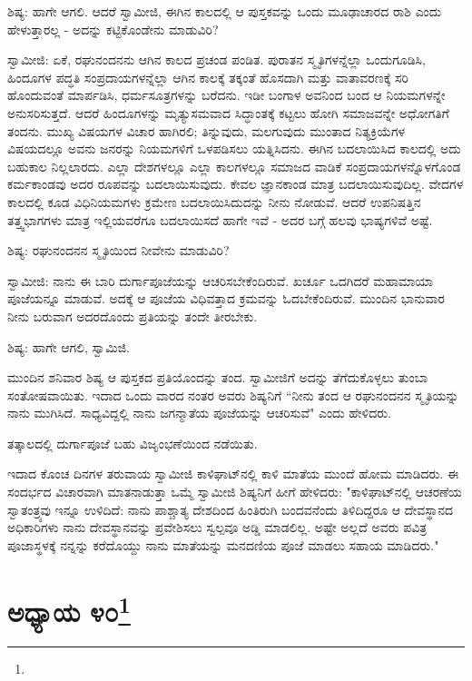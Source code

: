 ಶಿಷ್ಯ: ಹಾಗೇ ಆಗಲಿ. ಆದರೆ ಸ್ವಾಮೀಜಿ, ಈಗಿನ ಕಾಲದಲ್ಲಿ ಆ ಪುಸ್ತಕವನ್ನು ಒಂದು ಮೂಢಾಚಾರದ ರಾಶಿ ಎಂದು ಹೇಳುತ್ತಾರಲ್ಲ - ಅದನ್ನು ಕಟ್ಟಿಕೊಂಡೇನು ಮಾಡುವಿರಿ?

ಸ್ವಾಮೀಜಿ: ಏಕೆ, ರಘುನಂದನನು ಆಗಿನ ಕಾಲದ ಪ್ರಚಂಡ ಪಂಡಿತ. ಪುರಾತನ ಸ್ಮೃತಿಗಳನ್ನೆಲ್ಲಾ ಒಂದುಗೂಡಿಸಿ, ಹಿಂದೂಗಳ ಪದ್ಧತಿ ಸಂಪ್ರದಾಯಗಳನ್ನೆಲ್ಲಾ ಆಗಿನ ಕಾಲಕ್ಕೆ ತಕ್ಕಂತೆ ಹೊಸದಾಗಿ ಮತ್ತು ವಾತಾವರಣಕ್ಕೆ ಸರಿ ಹೊಂದುವಂತೆ ಮಾರ್ಪಡಿಸಿ, ಧರ್ಮಸೂತ್ರಗಳನ್ನು ಬರೆದನು. ಇಡೀ ಬಂಗಾಳ ಅವನಿಂದ ಬಂದ ಆ ನಿಯಮಗಳನ್ನೇ ಅನುಸರಿಸುತ್ತದೆ. ಆದರೆ ಹಿಂದೂಗಳನ್ನು ಮೃತ್ಯುಸಮವಾದ ಸಿದ್ಧಾಂತಕ್ಕೆ ಕಟ್ಟಲು ಹೋಗಿ ಸಮಾಜವನ್ನೇ ಅಧೋಗತಿಗೆ ತಂದನು. ಮುಖ್ಯ ವಿಷಯಗಳ ವಿಚಾರ ಹಾಗಿರಲಿ; ತಿನ್ನುವುದು, ಮಲಗುವುದು ಮುಂತಾದ ನಿತ್ಯಕ್ರಿಯೆಗಳ ವಿಷಯದಲ್ಲೂ ಅವನು ಜನರನ್ನು ನಿಯಮಗಳಿಗೆ ಒಳಪಡಿಸಲು ಯತ್ನಿಸಿದನು. ಈಗಿನ ಬದಲಾಯಿಸಿದ ಕಾಲದಲ್ಲಿ ಅದು ಬಹುಕಾಲ ನಿಲ್ಲಲಾರದು. ಎಲ್ಲಾ ದೇಶಗಳಲ್ಲೂ ಎಲ್ಲಾ ಕಾಲಗಳಲ್ಲೂ ಸಮಾಜದ ವಾಡಿಕೆ ಸಂಪ್ರದಾಯಗಳನ್ನೊಳಗೊಂಡ ಕರ್ಮಕಾಂಡವು ಅದರ ರೂಪವನ್ನು ಬದಲಾಯಿಸುವುದು. ಕೇವಲ ಜ್ಞಾನಕಾಂಡ ಮಾತ್ರ ಬದಲಾಯಿಸುವುದಿಲ್ಲ. ವೇದಗಳ ಕಾಲದಲ್ಲಿ ಕೂಡ ವಿಧಿನಿಯಮಗಳು ಕ್ರಮೇಣ ಬದಲಾಯಿಸಿದುದನ್ನು ನೀನು ನೋಡುವೆ. ಆದರೆ ಉಪನಿಷತ್ತಿನ ತತ್ತ್ವಭಾಗಗಳು ಮಾತ್ರ ಇಲ್ಲಿಯವರೆಗೂ ಬದಲಾಯಿಸದೆ ಹಾಗೇ ಇವೆ - ಅದರ ಬಗ್ಗೆ ಹಲವು ಭಾಷ್ಯಗಳಿವೆ ಅಷ್ಟೆ.

ಶಿಷ್ಯ: ರಘುನಂದನನ ಸ್ಮೃತಿಯಿಂದ ನೀವೇನು ಮಾಡುವಿರಿ?

ಸ್ವಾಮೀಜಿ: ನಾನು ಈ ಬಾರಿ ದುರ್ಗಾಪೂಜೆಯನ್ನು ಆಚರಿಸಬೇಕೆಂದಿರುವೆ. ಖರ್ಚೂ ಒದಗಿದರೆ ಮಹಾಮಾಯಾ ಪೂಜೆಯನ್ನೂ ಮಾಡುವೆ. ಅದಕ್ಕೆ ಆ ಪೂಜೆಯ ವಿಧಿವತ್ತಾದ ಕ್ರಮವನ್ನು ಓದಬೇಕೆಂದಿರುವೆ. ಮುಂದಿನ ಭಾನುವಾರ ನೀನು ಬರುವಾಗ ಅದರದೊಂದು ಪ್ರತಿಯನ್ನು ತಂದೇ ತೀರಬೇಕು.

ಶಿಷ್ಯ: ಹಾಗೇ ಆಗಲಿ, ಸ್ವಾಮಿಜಿ.

ಮುಂದಿನ ಶನಿವಾರ ಶಿಷ್ಯ ಆ ಪುಸ್ತಕದ ಪ್ರತಿಯೊಂದನ್ನು ತಂದ. ಸ್ವಾಮೀಜಿಗೆ ಅದನ್ನು ತೆಗೆದುಕೊಳ್ಳಲು ತುಂಬಾ ಸಂತೋಷವಾಯಿತು. ಇದಾದ ಒಂದು ವಾರದ ನಂತರ ಅವರು ಶಿಷ್ಯನಿಗೆ “ನೀನು ತಂದ ಆ ರಘುನಂದನನ ಸ್ಮೃತಿಯನ್ನು ನಾನು ಮುಗಿಸಿದೆ. ಸಾಧ್ಯವಿದ್ದಲ್ಲಿ ನಾನು ಜಗನ್ಮಾತೆಯ ಪೂಜೆಯನ್ನು ಆಚರಿಸುವೆ" ಎಂದು ಹೇಳಿದರು.

ತತ್ಕಾಲದಲ್ಲಿ ದುರ್ಗಾಪೂಜೆ ಬಹು ವಿಜೃಂಭಣೆಯಿಂದ ನಡೆಯಿತು.

\delimiter

ಇದಾದ ಕೊಂಚ ದಿನಗಳ ತರುವಾಯ ಸ್ವಾಮೀಜಿ ಕಾಳಿಘಾಟ್‌ನಲ್ಲಿ ಕಾಳಿ ಮಾತೆಯ ಮುಂದೆ ಹೋಮ ಮಾಡಿದರು. ಈ ಸಂದರ್ಭದ ವಿಚಾರವಾಗಿ ಮಾತನಾಡುತ್ತಾ ಒಮ್ಮೆ ಸ್ವಾಮೀಜಿ ಶಿಷ್ಯನಿಗೆ ಹೀಗೆ ಹೇಳಿದರು: "ಕಾಳಿಘಾಟ್‌ನಲ್ಲಿ ಆಚರಣೆಯ ಸ್ವಾತಂತ್ರ್ಯವು ಇನ್ನೂ ಉಳಿದಿದೆ: ನಾನು ಪಾಶ್ಚಾತ್ಯ ದೇಶದಿಂದ ಹಿಂತಿರುಗಿ ಬಂದವನೆಂದು ತಿಳಿದಿದ್ದರೂ ಆ ದೇವಸ್ಥಾನದ ಅಧಿಕಾರಿಗಳು ನಾನು ದೇವಸ್ಥಾನವನ್ನು ಪ್ರವೇಶಿಸಲು ಸ್ವಲ್ಪವೂ ಅಡ್ಡಿ ಮಾಡಲಿಲ್ಲ. ಅಷ್ಟೇ ಅಲ್ಲದೆ ಅವರು ಪವಿತ್ರ ಪೂಜಾಸ್ಥಳಕ್ಕೆ ನನ್ನನ್ನು ಕರೆದೊಯ್ದು ನಾನು ಮಾತೆಯನ್ನು ಮನದಣಿಯ ಪೂಜೆ ಮಾಡಲು ಸಹಾಯ ಮಾಡಿದರು."

\newpage

\chapter[ಅಧ್ಯಾಯ ೪೦]{ಅಧ್ಯಾಯ ೪೦\protect\footnote{}}

